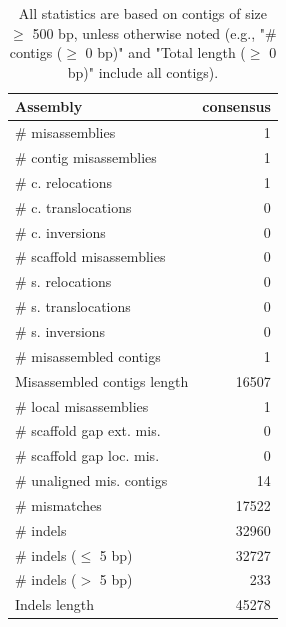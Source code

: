 \documentclass[12pt,a4paper]{article}
\begin{document}
\begin{table}[ht]
\begin{center}
\caption{All statistics are based on contigs of size $\geq$ 500 bp, unless otherwise noted (e.g., "\# contigs ($\geq$ 0 bp)" and "Total length ($\geq$ 0 bp)" include all contigs).}
\begin{tabular}{|l*{1}{|r}|}
\hline
Assembly & consensus \\ \hline
\# misassemblies & 1 \\ \hline
\hspace{2mm}\# contig misassemblies & 1 \\ \hline
\hspace{5mm}\# c. relocations & 1 \\ \hline
\hspace{5mm}\# c. translocations & 0 \\ \hline
\hspace{5mm}\# c. inversions & 0 \\ \hline
\hspace{2mm}\# scaffold misassemblies & 0 \\ \hline
\hspace{5mm}\# s. relocations & 0 \\ \hline
\hspace{5mm}\# s. translocations & 0 \\ \hline
\hspace{5mm}\# s. inversions & 0 \\ \hline
\# misassembled contigs & 1 \\ \hline
Misassembled contigs length & 16507 \\ \hline
\# local misassemblies & 1 \\ \hline
\# scaffold gap ext. mis. & 0 \\ \hline
\# scaffold gap loc. mis. & 0 \\ \hline
\# unaligned mis. contigs & 14 \\ \hline
\# mismatches & 17522 \\ \hline
\# indels & 32960 \\ \hline
\hspace{5mm}\# indels ($\leq$ 5 bp) & 32727 \\ \hline
\hspace{5mm}\# indels ($>$ 5 bp) & 233 \\ \hline
Indels length & 45278 \\ \hline
\end{tabular}
\end{center}
\end{table}
\end{document}
